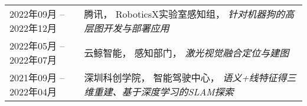 %
%


 
			

\begin{tabular}{ll}	
	\textsc{2022年09月 -- 2022年12月}			  & 腾讯， RoboticsX实验室感知组， \emph{针对机器狗的高层图开发与部署应用}\\
	\textsc{2022年05月 -- 2022年07月} 	&  云鲸智能， 感知部门， \emph{激光视觉融合定位与建图}\\
	\textsc{2021年09月 -- 2022年04月} 	&  深圳科创学院， 智能驾驶中心， \emph{语义+线特征得三维重建、基于深度学习的SLAM探索}\\
									
\end{tabular}